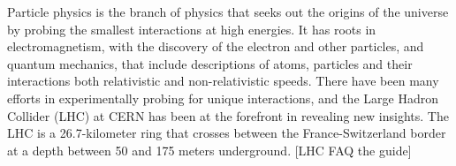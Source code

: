 Particle physics is the branch of physics that seeks out the origins of the universe by probing the smallest interactions at high energies.
It has roots in electromagnetism, with the discovery of the electron and other particles, and quantum mechanics, that include descriptions of atoms, particles and their interactions both relativistic and non-relativistic speeds. 
There have been many efforts in experimentally probing for unique interactions, and the Large Hadron Collider (LHC) at CERN has been at the forefront in revealing new insights.  
The LHC is a 26.7-kilometer ring that crosses between the France-Switzerland border at a depth between 50 and 175 meters underground. [LHC FAQ the guide]